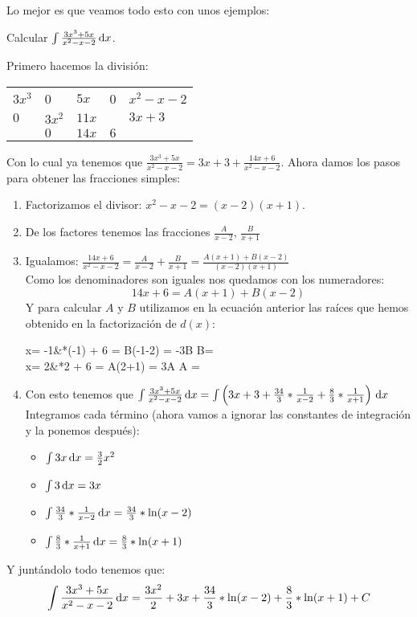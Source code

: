 \documentclass[a4paper,11pt,answers]{exam}
\begin{document}
Lo mejor es que veamos todo esto con unos ejemplos:
\begin{questions}
\question Calcular $\int \frac{3x^3 + 5x}{x^2 - x - 2}\,\mathrm{d}x$.
\begin{solution}
Primero hacemos la división:
\begin{center}
\begin{tabular}{lllll}
$3x^3$ & 0      & $5x$  & \multicolumn{1}{l|}{0} & $x^2 - x - 2$ \\ \cline{5-5} 
$0$   & $3x^2$ & $11x$ &                        & $3x +3$       \\
       & $0$    & $14x$ & $6$                    &
\end{tabular}
\end{center}
Con lo cual ya tenemos que $\frac{3x^3 + 5x}{x^2 - x - 2} = 3x + 3 + \frac{14x+6}{x^2 -x -2}$. Ahora damos los pasos para obtener las fracciones simples:
\begin{enumerate}
	\item Factorizamos el divisor: $x^2 -x -2 = (x-2)(x+1)$.
	\item De los factores tenemos las fracciones $\frac{A}{x-2}$, $\frac{B}{x + 1}$
	\item Igualamos: $\frac{14x + 6}{x^2 -x -2}  = \frac{A}{x-2} + \frac{B}{x + 1} = \frac{A(x+1) + B(x-2)}{(x-2)(x+1)}$\\
	Como los denominadores son iguales nos quedamos con los numeradores:
	\[14x+6 = A(x+1) + B(x-2)\]
	Y para calcular $A$ y $B$ utilizamos en la ecuación anterior las raíces que hemos obtenido en la factorización de $d(x)$:
	\begin{flalign*}
	x= -1&*(-1) + 6 = B(-1-2)  = -3B \to B= \\
	x= 2&*2 + 6 = A(2+1)  = 3A \to A = 
	\end{flalign*}
	\item Con esto tenemos que $\int \frac{3x^3 + 5x}{x^2 - x - 2}\,\mathrm{d}x =
	\int \left(3x + 3 + \frac{34}{3}* \frac{1}{x-2} + \frac{8}{3}*\frac{1}{x+1}\right)\,\mathrm{d}x$\\
	Integramos cada término (ahora vamos a ignorar las constantes de integración y la ponemos después):
	\begin{itemize}
		\item $\int 3x\,\mathrm{d}x = \frac{3}{2}x^2$
		\item $\int 3\,\mathrm{d}x = 3x$
		\item $\int \frac{34}{3}* \frac{1}{x-2}\,\mathrm{d}x = \frac{34}{3}* \ln (x-2)$
		\item $\int \frac{8}{3}*\frac{1}{x+1}\,\mathrm{d}x = \frac{8}{3}*\ln (x+1)$
	\end{itemize}
\end{enumerate}
Y juntándolo todo tenemos que:
\[\int \frac{3x^3 + 5x}{x^2 - x - 2}\,\mathrm{d}x = \frac{3x^2}{2} + 3x + \frac{34}{3}* \ln (x-2) +\frac{8}{3}*\ln (x+1) + C\]
\end{solution}


\end{questions}
\end{document}
